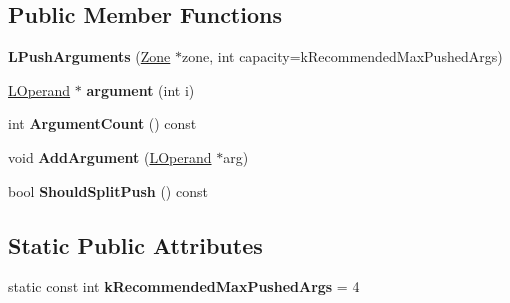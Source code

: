 \subsection*{Public Member Functions}
\begin{DoxyCompactItemize}
\item 
{\bfseries L\+Push\+Arguments} (\hyperlink{classv8_1_1internal_1_1_zone}{Zone} $\ast$zone, int capacity=k\+Recommended\+Max\+Pushed\+Args)\hypertarget{classv8_1_1internal_1_1_l_push_arguments_a5735b3d41ebd84e237cca9e3969b3bf6}{}\label{classv8_1_1internal_1_1_l_push_arguments_a5735b3d41ebd84e237cca9e3969b3bf6}

\item 
\hyperlink{classv8_1_1internal_1_1_l_operand}{L\+Operand} $\ast$ {\bfseries argument} (int i)\hypertarget{classv8_1_1internal_1_1_l_push_arguments_af20ebc4ddfeb7ce31400773b7ac31749}{}\label{classv8_1_1internal_1_1_l_push_arguments_af20ebc4ddfeb7ce31400773b7ac31749}

\item 
int {\bfseries Argument\+Count} () const \hypertarget{classv8_1_1internal_1_1_l_push_arguments_ae048d27b36b4d4a85fa5d18927eb8188}{}\label{classv8_1_1internal_1_1_l_push_arguments_ae048d27b36b4d4a85fa5d18927eb8188}

\item 
void {\bfseries Add\+Argument} (\hyperlink{classv8_1_1internal_1_1_l_operand}{L\+Operand} $\ast$arg)\hypertarget{classv8_1_1internal_1_1_l_push_arguments_a01a1a520928e9ad26d2523cfa80e69cd}{}\label{classv8_1_1internal_1_1_l_push_arguments_a01a1a520928e9ad26d2523cfa80e69cd}

\item 
bool {\bfseries Should\+Split\+Push} () const \hypertarget{classv8_1_1internal_1_1_l_push_arguments_a9e3847bca6b13c3aa779cf19584b9c2e}{}\label{classv8_1_1internal_1_1_l_push_arguments_a9e3847bca6b13c3aa779cf19584b9c2e}

\end{DoxyCompactItemize}
\subsection*{Static Public Attributes}
\begin{DoxyCompactItemize}
\item 
static const int {\bfseries k\+Recommended\+Max\+Pushed\+Args} = 4\hypertarget{classv8_1_1internal_1_1_l_push_arguments_abedc8f44096126c9453455b6d4280f93}{}\label{classv8_1_1internal_1_1_l_push_arguments_abedc8f44096126c9453455b6d4280f93}

\end{DoxyCompactItemize}
